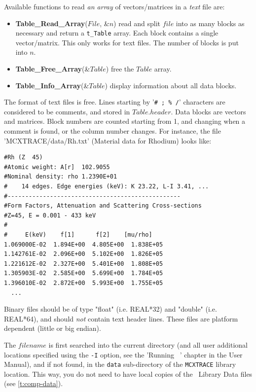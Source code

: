 Available functions to read \emph{an array} of vectors/matrices in a \emph{text} file are:
\begin{itemize}
\item {\bfseries Table\_Read\_Array}($File$, \&$n$) read and split $file$
into as many blocks as necessary and return a \verb+t_Table+ array.
Each block contains a single vector/matrix. This only works for text files.
The number of blocks is put into $n$.
\item {\bfseries Table\_Free\_Array}(\&$Table$) free the $Table$ array.
\item {\bfseries Table\_Info\_Array}(\&$Table$) display information about all data blocks.
\end{itemize}

The format of text files is free. Lines starting by '\verb+# ; % /+' characters are considered to be comments, and stored in $Table.header$. Data blocks are vectors and matrices. Block numbers are counted starting from 1, and changing when a comment is found, or the column number changes. For instance, the file 'MCXTRACE/data/Rh.txt' (Material data for Rhodium) looks like:
\begin{lstlisting}
#Rh (Z  45)
#Atomic weight: A[r]  102.9055
#Nominal density: rho 1.2390E+01
#    14 edges. Edge energies (keV): K 23.22, L-I 3.41, ...
#-------------------------------------------------
#Form Factors, Attenuation and Scattering Cross-sections
#Z=45, E = 0.001 - 433 keV
#
#     E(keV)    f[1]      f[2]    [mu/rho]
1.069000E-02  1.894E+00  4.805E+00  1.838E+05
1.142761E-02  2.096E+00  5.102E+00  1.826E+05
1.221612E-02  2.327E+00  5.401E+00  1.808E+05
1.305903E-02  2.585E+00  5.699E+00  1.784E+05
1.396010E-02  2.872E+00  5.993E+00  1.755E+05
  ...
\end{lstlisting}
Binary files should be of type "float" (i.e. REAL*32) and "double" (i.e. REAL*64),
and should \emph{not} contain text header lines. These files are platform
dependent (little or big endian).

The $filename$ is first searched into the current directory (and all user additional locations specified using the \verb+-I+ option, see the 'Running \MCX\ ' chapter in the User Manual), and if not found, in the \verb+data+ sub-directory of the \verb+MCXTRACE+ library location. 
 This way, you do not need to have local copies of the \MCX\ Library Data files (see \cref{t:comp-data}).

